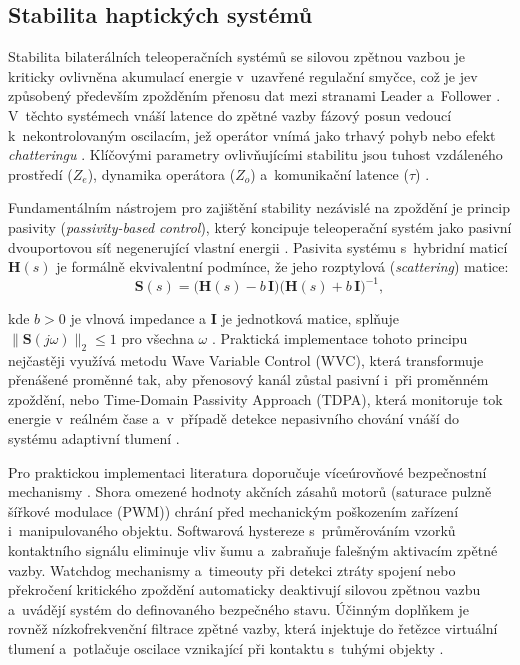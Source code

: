 \documentclass[FZS,DP]{tulthesis}
\begin{document}
\subsection{Stabilita haptických systémů}
Stabilita bilaterálních teleoperačních systémů se silovou zpětnou vazbou je kriticky ovlivněna akumulací energie v~uzavřené regulační smyčce, což je jev způsobený především zpožděním přenosu dat mezi stranami Leader a~Follower \cite{Patel2022, Black2025}.
V~těchto systémech vnáší latence do zpětné vazby fázový posun vedoucí k~nekontrolovaným oscilacím, jež operátor vnímá jako trhavý pohyb nebo efekt \textit{chatteringu} \cite{Patel2022, Black2025, GIUDICI2025}.
Klíčovými parametry ovlivňujícími stabilitu jsou tuhost vzdáleného prostředí ($Z_e$), dynamika operátora ($Z_o$) a~komunikační latence ($\tau$) \cite{Black2025}.

Fundamentálním nástrojem pro zajištění stability nezávislé na zpoždění je princip pasivity (\textit{passivity-based control}), který koncipuje teleoperační systém jako pasivní dvouportovou síť negenerující vlastní energii \cite{Patel2022, Black2025}.
Pasivita systému s~hybridní maticí $\mathbf{H}(s)$ je formálně ekvivalentní podmínce, že jeho rozptylová (\textit{scattering}) matice:
%
\begin{equation}
    \mathbf{S}(s)
    = \bigl(\mathbf{H}(s) - b\,\mathbf{I}\bigr)
      \bigl(\mathbf{H}(s) + b\,\mathbf{I}\bigr)^{-1},
\end{equation}

kde $b > 0$ je vlnová impedance a $\mathbf{I}$ je jednotková matice, splňuje $\|\mathbf{S}(j\omega)\|_2 \leq 1$ pro všechna $\omega$ \cite{Black2025, Patel2022}.
Praktická implementace tohoto principu nejčastěji využívá metodu Wave Variable Control (WVC), která transformuje přenášené proměnné tak, aby přenosový kanál zůstal pasivní i~při proměnném zpoždění, nebo Time-Domain Passivity Approach (TDPA), která monitoruje tok energie v~reálném čase a~v~případě detekce nepasivního chování vnáší do systému adaptivní tlumení \cite{Patel2022, Bolarinwa2022}.

Pro praktickou implementaci literatura doporučuje víceúrovňové bezpečnostní mechanismy \cite{Patel2022, Black2025, Bolarinwa2022}.
Shora omezené hodnoty akčních zásahů motorů (saturace pulzně šířkové modulace (PWM)) chrání před mechanickým poškozením zařízení i~manipulovaného objektu.
Softwarová hystereze s~průměrováním vzorků kontaktního signálu eliminuje vliv šumu a~zabraňuje falešným aktivacím zpětné vazby.
Watchdog mechanismy a~timeouty při detekci ztráty spojení nebo překročení kritického zpoždění automaticky deaktivují silovou zpětnou vazbu a~uvádějí systém do definovaného bezpečného stavu.
Účinným doplňkem je rovněž nízkofrekvenční filtrace zpětné vazby, která injektuje do řetězce virtuální tlumení a~potlačuje oscilace vznikající při kontaktu s~tuhými objekty \cite{Black2025, Patel2022}.
\end{document}
